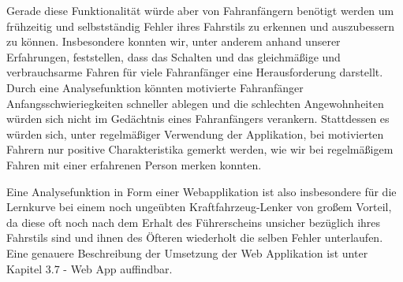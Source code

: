 Gerade diese Funktionalität würde aber von Fahranfängern benötigt werden um frühzeitig und selbstständig Fehler ihres Fahrstils zu erkennen und auszubessern zu können. Insbesondere konnten wir, unter anderem anhand unserer Erfahrungen, feststellen, dass das Schalten und das gleichmäßige und verbrauchsarme Fahren für viele Fahranfänger eine Herausforderung darstellt. Durch eine Analysefunktion könnten motivierte Fahranfänger Anfangsschwieriegkeiten schneller ablegen und die schlechten Angewohnheiten würden sich nicht im  Gedächtnis eines Fahranfängers verankern. Stattdessen es würden sich, unter regelmäßiger Verwendung der Applikation, bei motivierten Fahrern nur positive Charakteristika gemerkt werden, wie wir bei regelmäßigem Fahren mit einer erfahrenen Person merken konnten.

Eine Analysefunktion in Form einer Webapplikation ist also insbesondere für die Lernkurve bei einem noch ungeübten Kraftfahrzeug-Lenker von großem Vorteil, da diese oft noch nach dem Erhalt des Führerscheins unsicher bezüglich ihres Fahrstils sind und ihnen des Öfteren wiederholt die selben Fehler unterlaufen. Eine genauere Beschreibung der Umsetzung der Web Applikation ist unter Kapitel 3.7 - Web App auffindbar.

\clearpage %
